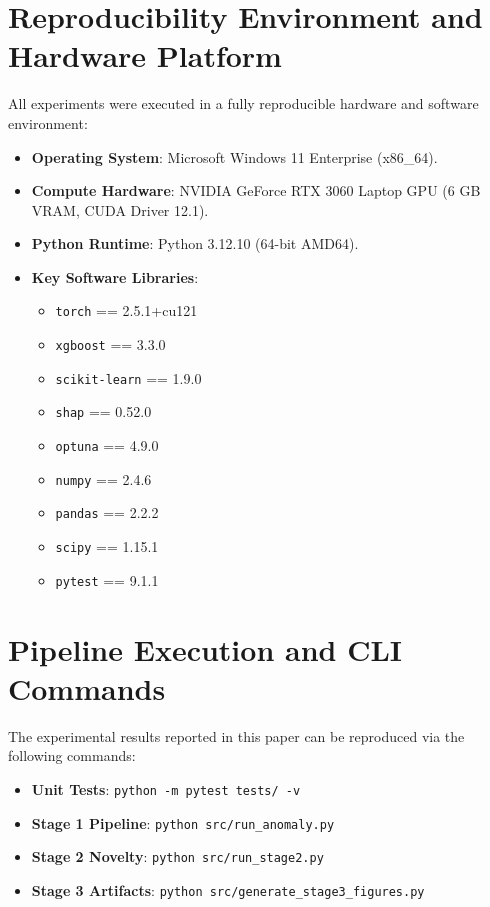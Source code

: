 \section{Reproducibility Environment and Hardware Platform}
\label{sec:reproducibility}

All experiments were executed in a fully reproducible hardware and software environment:
\begin{itemize}
    \item \textbf{Operating System}: Microsoft Windows 11 Enterprise (x86\_64).
    \item \textbf{Compute Hardware}: NVIDIA GeForce RTX 3060 Laptop GPU (6 GB VRAM, CUDA Driver 12.1).
    \item \textbf{Python Runtime}: Python 3.12.10 (64-bit AMD64).
    \item \textbf{Key Software Libraries}:
    \begin{itemize}
        \item \texttt{torch} == 2.5.1+cu121
        \item \texttt{xgboost} == 3.3.0
        \item \texttt{scikit-learn} == 1.9.0
        \item \texttt{shap} == 0.52.0
        \item \texttt{optuna} == 4.9.0
        \item \texttt{numpy} == 2.4.6
        \item \texttt{pandas} == 2.2.2
        \item \texttt{scipy} == 1.15.1
        \item \texttt{pytest} == 9.1.1
    \end{itemize}
\end{itemize}

\section{Pipeline Execution and CLI Commands}
\label{sec:commands}

The experimental results reported in this paper can be reproduced via the following commands:
\begin{itemize}
    \item \textbf{Unit Tests}: \texttt{python -m pytest tests/ -v}
    \item \textbf{Stage 1 Pipeline}: \texttt{python src/run\_anomaly.py}
    \item \textbf{Stage 2 Novelty}: \texttt{python src/run\_stage2.py}
    \item \textbf{Stage 3 Artifacts}: \texttt{python src/generate\_stage3\_figures.py}
\end{itemize}

